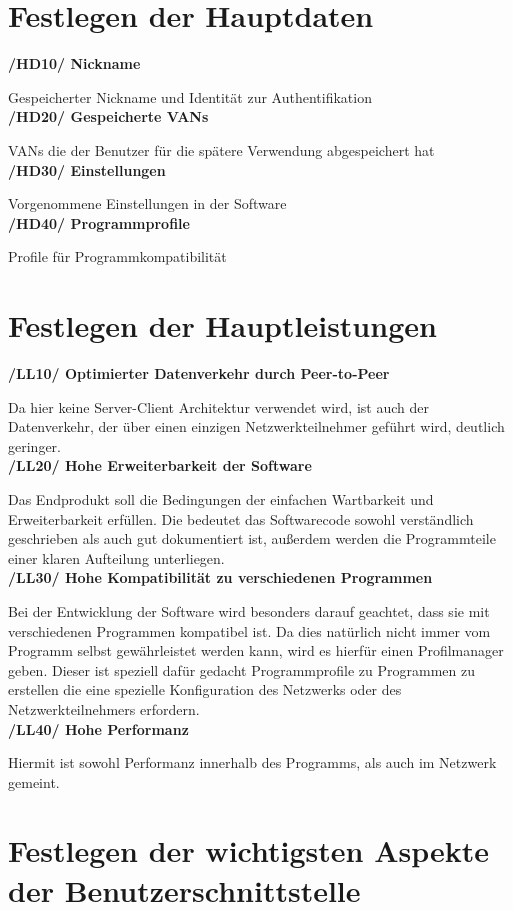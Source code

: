 \documentclass[a4paper,12pt]{scrreprt}
\begin{document}
	\section{Festlegen der Hauptdaten}
	\textbf {/HD10/ Nickname}
	
	Gespeicherter Nickname und Identität zur Authentifikation\\
	\textbf {/HD20/ Gespeicherte VANs}
	
	VANs die der Benutzer für die spätere Verwendung abgespeichert hat\\
	\textbf {/HD30/ Einstellungen}
	
	Vorgenommene Einstellungen in der Software\\
	\textbf {/HD40/ Programmprofile}
	
	Profile für Programmkompatibilität
	
	
	\section{Festlegen der Hauptleistungen}
	
	   \textbf{/LL10/ Optimierter Datenverkehr durch Peer-to-Peer}
		
		Da hier keine Server-Client Architektur verwendet wird, ist auch der Datenverkehr, der über einen einzigen Netzwerkteilnehmer geführt wird, deutlich geringer.\\
		\textbf {/LL20/ Hohe Erweiterbarkeit der Software}
		
		Das Endprodukt soll die Bedingungen der einfachen Wartbarkeit und Erweiterbarkeit erfüllen. Die bedeutet das Softwarecode sowohl verständlich geschrieben als auch gut dokumentiert ist, außerdem werden die Programmteile einer klaren Aufteilung unterliegen.\\
		\textbf {/LL30/ Hohe Kompatibilität zu verschiedenen Programmen}
		
		Bei der Entwicklung der Software wird besonders darauf geachtet, dass sie mit verschiedenen Programmen kompatibel ist. Da dies natürlich nicht immer vom Programm selbst gewährleistet werden kann, wird es hierfür einen Profilmanager geben. Dieser ist speziell dafür gedacht Programmprofile zu Programmen zu erstellen die eine spezielle Konfiguration des Netzwerks oder des Netzwerkteilnehmers erfordern.\\
		\textbf {/LL40/ Hohe Performanz}
		
		Hiermit ist sowohl Performanz innerhalb des Programms, als auch im Netzwerk gemeint.
	\section{Festlegen der wichtigsten Aspekte der Benutzerschnittstelle}
		
\end{document}
